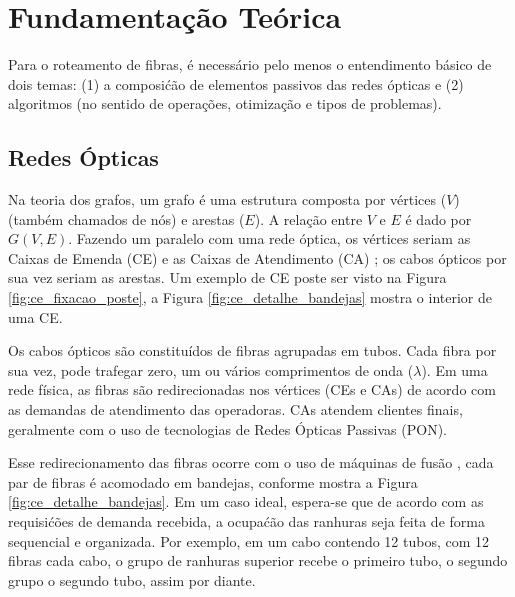 \section{Fundamentação Teórica} \label{sec:fundaments}

Para o roteamento de fibras, é necessário pelo menos o entendimento básico de
dois temas: (1) a composićão de elementos passivos das redes ópticas e (2)
algoritmos (no sentido de operações, otimização e tipos de problemas).

\subsection{Redes Ópticas}

Na teoria dos grafos, um grafo é uma estrutura composta por vértices ($V$)
(também chamados de nós) e arestas ($E$). A relação entre $V$ e $E$ é dado por
$G(V,E)$. Fazendo um paralelo com uma rede óptica, os vértices seriam as Caixas
de Emenda (CE) e as Caixas de Atendimento (CA) \cite{maeda2009optical}; os
cabos ópticos por sua vez seriam as arestas. Um exemplo de CE poste ser visto
na Figura \ref{fig:ce_fixacao_poste}, a Figura \ref{fig:ce_detalhe_bandejas}
mostra o interior de uma CE.

Os cabos ópticos são constituídos de fibras agrupadas em tubos. Cada fibra por
sua vez, pode trafegar zero, um ou vários comprimentos de onda ($\lambda$).
Em uma rede física, as fibras são redirecionadas nos vértices (CEs e CAs) de
acordo com as demandas de atendimento das operadoras. CAs atendem clientes finais,
geralmente com o uso de tecnologias de Redes Ópticas Passivas (PON).

Esse redirecionamento das fibras ocorre com o uso de máquinas de fusão
\cite{maeda2009optical}, cada par de fibras é acomodado em bandejas, conforme
mostra a Figura \ref{fig:ce_detalhe_bandejas}. Em um caso ideal, espera-se que
de acordo com as requisićões de demanda recebida, a ocupaćão das ranhuras seja
feita de forma sequencial e organizada. Por exemplo, em um cabo contendo 12
tubos, com 12 fibras cada cabo, o grupo de ranhuras superior recebe o primeiro
tubo, o segundo grupo o segundo tubo, assim por diante.

